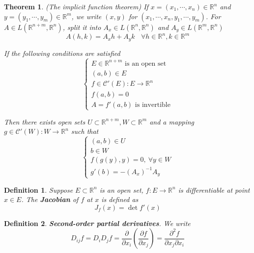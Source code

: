\documentclass[aps,pra,onecolumn,notitlepage,superscriptaddress]{revtex4-1}
\newcommand{\R}{\mathbb{R}}
\newtheorem{theo}{Theorem}
\newtheorem{defi}{Definition}
\begin{document}
    \begin{theo}
        (The implicit function theorem)
        If $x = (x_1,\cdots,x_n) \in \R^n$ and $y = (y_1,\cdots,y_m) \in \R^m$, we write $(x,y)$ for $(x_1,\cdots,x_n,y_1,\cdots,y_m)$. For $A \in L(\R^{n+m}, \R^n)$, split it into $A_x \in L(\R^n, \R^n)$ and $A_y \in L(\R^m, \R^n)$
        \begin{equation}
            A(h,k) = A_x h + A_y k \ \ \ \ \forall h \in \R^n, k \in \R^m
        \end{equation}

        If the following conditions are satisfied
        \begin{equation*}
            \begin{cases}
                \text{$E \in \R^{n+m}$ is an open set} \\
                (a,b) \in E \\
                f \in \mathscr{C}'(E) : E \to \R^n \\
                f(a,b) = 0 \\
                A = f'(a,b) \text{ is invertible}
            \end{cases}
        \end{equation*}

        Then there exists open sets $U \subset \R^{n+m}, W \subset \R^{m}$ and a mapping $g \in \mathscr{C}'(W) : W \to \R^n$ such that
        \begin{equation*}
            \begin{cases}
                (a,b) \in U \\
                b \in W \\
                f(g(y),y) = 0, \ \forall y \in W \\
                g'(b) = -(A_x)^{-1} A_y
            \end{cases}
        \end{equation*} 
    \end{theo}

    \begin{defi}
        Suppose $E \subset \R^n$ is an open set, $f: E \to \R^n$ is differentiable at point $x \in E$. The \textbf{Jacobian} of $f$ at $x$ is defined as
        \begin{equation}
            J_f(x) = \det f'(x)
        \end{equation}
    \end{defi}

    \begin{defi}
        \textbf{Second-order partial derivatives}. We write
        \begin{equation}
            D_{ij}f = D_iD_jf = \frac{\partial}{\partial x_i} 
            \left(
                \frac{\partial f}{\partial x_j}
            \right)
            = \frac{\partial^2 f}{\partial x_j \partial x_i}
        \end{equation}
    \end{defi}
\end{document}
